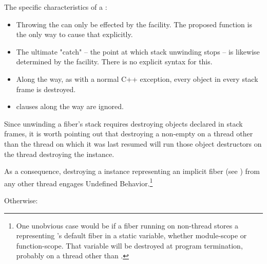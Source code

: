The specific characteristics of a \foreignex:

\begin{itemize}
    \item Throwing the \foreignex can only be effected by the \fiber
    facility. The proposed \unwindfib function is the only way to cause that
    explicitly.
    \item The ultimate "catch" -- the point at which stack unwinding stops --
    is likewise determined by the \fiber facility. There is no explicit syntax
    for this.
    \item Along the way, as with a normal C++ exception, every object in every
    stack frame is destroyed.
    \item {} clauses along the way are ignored.
\end{itemize}

Since unwinding a fiber's stack requires destroying objects declared in stack
frames,
it is worth pointing out that destroying a non-empty \fiber on a thread other
than the thread on which it was last resumed will run those object destructors
on the thread destroying the \fiber instance.

As a consequence, destroying a \fiber instance representing an implicit fiber
(see )
from any other thread engages Undefined Behavior.\footnote{One unobvious case
would be if a fiber running on non-\main thread  stores a \fiber
representing 's default fiber in a static variable, whether
module-scope or function-scope. That variable will be destroyed at program
termination, probably on a thread other than .}

Otherwise:

